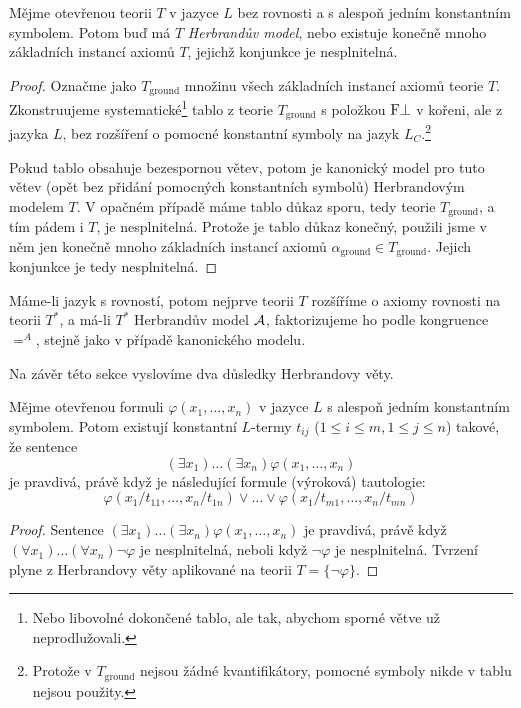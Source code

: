\begin{theorem}
Mějme otevřenou teorii $T$ v jazyce $L$ bez rovnosti a s alespoň jedním konstantním symbolem. Potom buď má $T$ \emph{Herbrandův model}, nebo existuje konečně mnoho základních instancí axiomů $T$, jejichž konjunkce je nesplnitelná.
\end{theorem}
\begin{proof}
Označme jako $T_\text{ground}$ množinu všech základních instancí axiomů teorie $T$. Zkonstruujeme systematické\footnote{Nebo libovolné dokončené tablo, ale tak, abychom sporné větve už neprodlužovali.} tablo z teorie $T_\text{ground}$ s položkou $\mathrm{F}\bot$ v kořeni, ale z jazyka $L$, bez rozšíření o pomocné konstantní symboly na jazyk $L_C$.\footnote{Protože v $T_\text{ground}$ nejsou žádné kvantifikátory, pomocné symboly nikde v tablu nejsou použity.}

Pokud tablo obsahuje bezespornou větev, potom je kanonický model pro tuto větev (opět bez přidání pomocných konstantních symbolů) Herbrandovým modelem $T$. V opačném případě máme tablo důkaz sporu, tedy teorie $T_\text{ground}$, a tím pádem i $T$, je nesplnitelná. Protože je tablo důkaz konečný, použili jsme v něm jen konečně mnoho základních instancí axiomů $\alpha_\text{ground}\in T_\text{ground}$. Jejich konjunkce je tedy nesplnitelná.
\end{proof}

\begin{remark}
Máme-li jazyk s rovností, potom nejprve teorii $T$ rozšíříme o axiomy rovnosti na teorii $T^*$, a má-li $T^*$ Herbrandův model $\mathcal{A}$, faktorizujeme ho podle kongruence $=^A$, stejně jako v případě kanonického modelu.
\end{remark}

Na závěr této sekce vyslovíme dva důsledky Herbrandovy věty.

\begin{corollary}
    Mějme otevřenou formuli $\varphi(x_1,\dots,x_n)$ v jazyce $L$ s alespoň jedním konstantním symbolem. Potom existují konstantní $L$-termy $t_{ij}$ ($1\leq i\leq m,1\leq j\leq n$) takové, že sentence 
    $$
    (\exists x_1)\dots(\exists x_n)\varphi(x_1,\dots,x_n)$$ 
    je pravdivá, právě když je následující formule (výroková) tautologie:
    $$
    \varphi(x_1/t_{11},\dots,x_n/t_{1n})\lor \dots \lor \varphi(x_1/t_{m1},\dots,x_n/t_{mn})
    $$
\end{corollary}
\begin{proof}
Sentence $(\exists x_1)\dots(\exists x_n)\varphi(x_1,\dots,x_n)$ je pravdivá, právě když $(\forall x_1)\dots(\forall x_n)\neg\varphi$ je nesplnitelná, neboli když $\neg\varphi$ je nesplnitelná. Tvrzení plyne z Herbrandovy věty aplikované na teorii $T=\{\neg\varphi\}$.
\end{proof}

